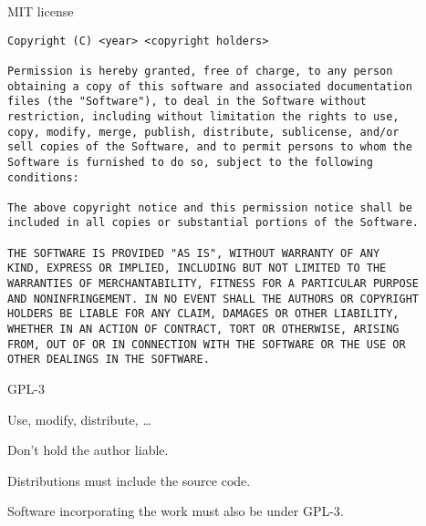 \documentclass[aspectratio=169,12pt,t]{beamer}
\begin{document}
\begin{frame}[c,fragile]{MIT license}

\begin{lstlisting}
Copyright (C) <year> <copyright holders>

Permission is hereby granted, free of charge, to any person
obtaining a copy of this software and associated documentation
files (the "Software"), to deal in the Software without
restriction, including without limitation the rights to use,
copy, modify, merge, publish, distribute, sublicense, and/or
sell copies of the Software, and to permit persons to whom the
Software is furnished to do so, subject to the following
conditions:

The above copyright notice and this permission notice shall be
included in all copies or substantial portions of the Software.

THE SOFTWARE IS PROVIDED "AS IS", WITHOUT WARRANTY OF ANY
KIND, EXPRESS OR IMPLIED, INCLUDING BUT NOT LIMITED TO THE
WARRANTIES OF MERCHANTABILITY, FITNESS FOR A PARTICULAR PURPOSE
AND NONINFRINGEMENT. IN NO EVENT SHALL THE AUTHORS OR COPYRIGHT
HOLDERS BE LIABLE FOR ANY CLAIM, DAMAGES OR OTHER LIABILITY,
WHETHER IN AN ACTION OF CONTRACT, TORT OR OTHERWISE, ARISING
FROM, OUT OF OR IN CONNECTION WITH THE SOFTWARE OR THE USE OR
OTHER DEALINGS IN THE SOFTWARE.
\end{lstlisting}


\end{frame}


\begin{frame}{GPL-3}

\bbi
\item Use, modify, distribute, \dots
\item Don't hold the author liable.
\item Distributions must include the source code.
\item Software incorporating the work {\hilit must also be under GPL-3}.
\ei

\end{frame}
\end{document}
